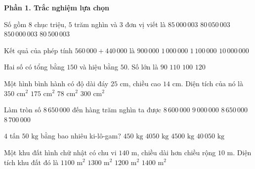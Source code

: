 \textbf{Phần 1. Trắc nghiệm lựa chọn}

\begin{ex} %
Số gồm $8$ chục triệu, $5$ trăm nghìn và $3$ đơn vị viết là
\choice
{$85\,000\,003$}
{$80\,050\,003$}
{$850\,000\,003$}
{\True $80\,500\,003$}
\end{ex}

\begin{ex} %
Kết quả của phép tính $560\,000 + 440\,000$ là
\choice
{$900\,000$}
{\True $1\,000\,000$}
{$1\,100\,000$}
{$10\,000\,000$}
\end{ex}

\begin{ex} %
Hai số có tổng bằng $150$ và hiệu bằng $50$. Số lớn là
\choice
{$90$}
{$110$}
{\True $100$}
{$120$}
\end{ex}

\begin{ex} %
Một hình bình hành có độ dài đáy $25\text{ cm}$, chiều cao $14\text{ cm}$. Diện tích của nó là
\choice
{\True $350\text{ cm}^2$}
{$175\text{ cm}^2$}
{$78\text{ cm}^2$}
{$300\text{ cm}^2$}
\end{ex}

\begin{ex} %
Làm tròn số $8\,650\,000$ đến hàng trăm nghìn ta được
\choice
{$8\,600\,000$}
{$9\,000\,000$}
{$8\,650\,000$}
{\True $8\,700\,000$}
\end{ex}

\begin{ex} %
$4$ tấn $50\text{ kg}$ bằng bao nhiêu ki-lô-gam?
\choice
{$450\text{ kg}$}
{\True $4050\text{ kg}$}
{$4500\text{ kg}$}
{$40\,050\text{ kg}$}
\end{ex}

\begin{ex} %
Một khu đất hình chữ nhật có chu vi $140\text{ m}$, chiều dài hơn chiều rộng $10\text{ m}$. Diện tích khu đất đó là
\choice
{$1100\text{ m}^2$}
{$1300\text{ m}^2$}
{\True $1200\text{ m}^2$}
{$1400\text{ m}^2$}
\end{ex}


